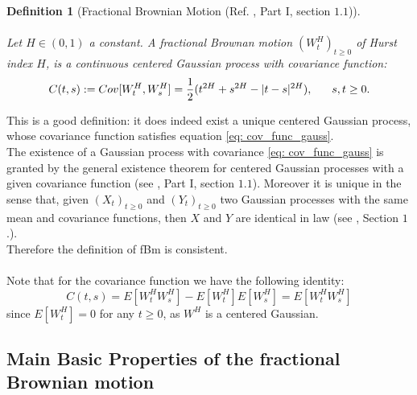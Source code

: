 \documentclass[a4paper,italian,11pt]{book}
\theoremstyle{plain}
\newtheorem{definition}{Definition}
\theoremstyle{remark}
\theoremstyle{plain}
\begin{document}
\begin{definition}[Fractional Brownian Motion (Ref. \cite{ZhangBook}, Part I, section $1.1$)]
\label{def: fractionalBrownianMotion}
\\\
\\
Let $H\in (0,1)$ a constant. A fractional Brownan motion $(W^H_t)_{t\ge 0}$ of Hurst index $H$, is a continuous centered Gaussian process with covariance function:
\begin{equation}
\label{eq: cov_func_gauss}
    C(t,s) := Cov[W^H_t,W^H_s] = \frac{1}{2}(t^{2H} + s^ {2H} - |t-s| ^ {2H}), \hspace{0.6cm} s,t \ge 0.
\end{equation}
\end{definition}
This is a good definition: it does indeed exist a unique centered Gaussian process, whose covariance function satisfies equation \eqref{eq: cov_func_gauss}.\\
The existence of a Gaussian process with covariance \eqref{eq: cov_func_gauss} is granted by the general existence theorem for centered Gaussian processes with a given covariance function (see \cite{fBmExistence}, Part I, section $1.1$). 
Moreover it is unique in the sense that, given $(X_t)_{t\ge 0}$ and $(Y_t)_{t\ge 0}$ two Gaussian processes with the same mean and covariance functions, then $X$ and $Y$ are identical in law (see \cite{StevenGaussian}, Section $1$.).
\\
Therefore the definition of fBm is consistent. 
\\
\\
Note that for the covariance function we have the following identity:
\begin{equation}
C(t,s)=E[W^H_t W^H_s]-E[W^H_t]E[W^H_s]=E[W^H_t W^H_s]
\end{equation}
since $E[W^H_t]=0$ for any $t \ge 0$, as $W^H$ is a centered Gaussian.

\subsection{Main Basic Properties of the fractional Brownian motion}
\end{document}
